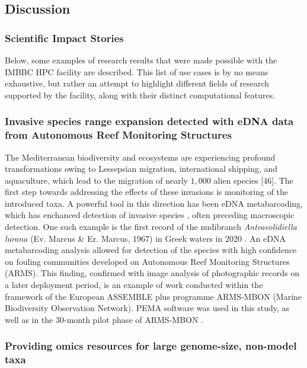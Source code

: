    
   \subsection{Discussion}

   \subsubsection*{Scientific Impact Stories}

   Below, some examples of research results that were made possible with the IMBBC HPC facility are described. This list of use cases is by no means exhaustive, but rather an attempt to highlight different fields of research supported by the facility, along with their distinct computational features.

   \subsubsection*{Invasive species range expansion detected with eDNA data from Autonomous Reef Monitoring Structures}

   The Mediterranean biodiversity and ecosystems are experiencing profound transformations owing to Lessepsian migration, international shipping, and aquaculture, which lead to the migration of nearly $1,000$ alien species [46]. 
   The first step towards addressing the effects of these invasions is monitoring of the introduced taxa. 
   A powerful tool in this direction has been eDNA metabarcoding, which has enchanced detection of invasive species \citep{klymus2017environmental}, often preceding macroscopic detection. 
   One such example is the first record of the nudibranch \textit{Anteaeolidiella lurana} (Ev. Marcus \& Er. Marcus, 1967) in Greek waters in 2020 \citep{bariche2020new}. 
   An eDNA metabarcoding analysis allowed for detection of the species with high confidence on fouling communities developed on Autonomous Reef Monitoring Structures (ARMS). 
   This finding, confirmed with image analysis of photographic records on a later deployment period, is an example of work conducted within the framework of the European ASSEMBLE plus programme ARMS-MBON (Marine Biodiversity Observation Network). 
   PEMA software \citep{zafeiropoulos2020pema} was used in this study, as well as in the $30$-month pilot phase of ARMS-MBON \citep{katsanevakis2014invading}.

   \subsubsection*{Providing omics resources for large genome-size, non-model taxa}

